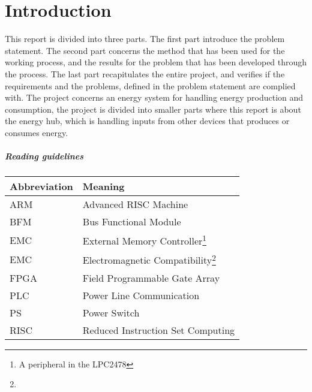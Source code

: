 \chapter{Introduction}
This report is divided into three parts. The first part introduce the problem statement. The second part concerns the method that has been used for the working process, and the results for the problem that has been developed through the process. The last part recapitulates the entire project, and verifies if the requirements and the problems, defined in the problem statement are complied with.
The project concerns an energy system for handling energy production and consumption, the project is divided into smaller parts where this report is about the energy hub, which is handling inputs from other devices that produces or consumes energy.
\paragraph{Reading guidelines}

\begin{table}
    \begin{tabular}{|l|l|}
        \hline
        \textbf{Abbreviation} & \textbf{Meaning} \\ \hline
        ARM		& Advanced RISC Machine \\ \hline
        BFM		& Bus Functional Module \\ \hline
        EMC		& External Memory Controller\footnote{A peripheral in the LPC2478} \\ \hline
        EMC		& Electromagnetic Compatibility\footnote{} \\ \hline
        FPGA	& Field Programmable Gate Array \\ \hline
        PLC		& Power Line Communication \\ \hline
        PS		& Power Switch \\ \hline
        RISC	& Reduced Instruction Set Computing \\
        \hline
    \end{tabular}
\end{table}
